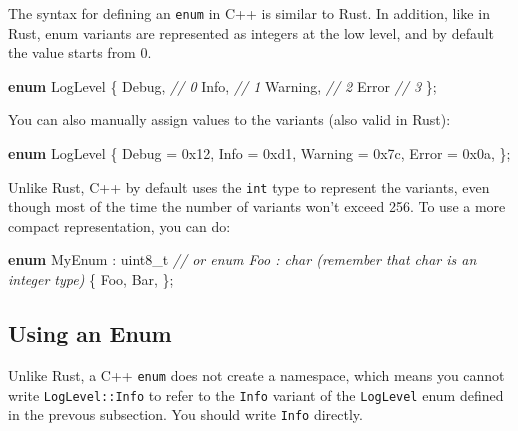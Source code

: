 \documentclass[
]{book}
\newenvironment{Shaded}{\begin{snugshade}}{\end{snugshade}}
\newcommand{\BaseNTok}[1]{\textcolor[rgb]{0.00,0.00,0.81}{#1}}
\newcommand{\CommentTok}[1]{\textcolor[rgb]{0.56,0.35,0.01}{\textit{#1}}}
\newcommand{\DataTypeTok}[1]{\textcolor[rgb]{0.13,0.29,0.53}{#1}}
\newcommand{\KeywordTok}[1]{\textcolor[rgb]{0.13,0.29,0.53}{\textbf{#1}}}
\newcommand{\NormalTok}[1]{#1}
\begin{document}
The syntax for defining an \texttt{enum} in C++ is similar to Rust. In addition, like in Rust, enum
variants are represented as integers at the low level, and by default the value starts from 0.

\begin{Shaded}
\begin{Highlighting}[]
\KeywordTok{enum}\NormalTok{ LogLevel}
\NormalTok{\{}
\NormalTok{    Debug,   }\CommentTok{// 0}
\NormalTok{    Info,    }\CommentTok{// 1}
\NormalTok{    Warning, }\CommentTok{// 2}
\NormalTok{    Error    }\CommentTok{// 3}
\NormalTok{\};}
\end{Highlighting}
\end{Shaded}

You can also manually assign values to the variants (also valid in Rust):

\begin{Shaded}
\begin{Highlighting}[]
\KeywordTok{enum}\NormalTok{ LogLevel}
\NormalTok{\{}
\NormalTok{    Debug   = }\BaseNTok{0x12}\NormalTok{,}
\NormalTok{    Info    = }\BaseNTok{0xd1}\NormalTok{,}
\NormalTok{    Warning = }\BaseNTok{0x7c}\NormalTok{,}
\NormalTok{    Error   = }\BaseNTok{0x0a}\NormalTok{,}
\NormalTok{\};}
\end{Highlighting}
\end{Shaded}

Unlike Rust, C++ by default uses the \texttt{int} type to represent the variants, even though most of the
time the number of variants won't exceed 256. To use a more compact representation, you can do:

\begin{Shaded}
\begin{Highlighting}[]
\KeywordTok{enum}\NormalTok{ MyEnum : }\DataTypeTok{uint8\_t}
\CommentTok{// or \textasciigrave{}enum Foo : char\textasciigrave{} (remember that \textasciigrave{}char\textasciigrave{} is an integer type)}
\NormalTok{\{}
\NormalTok{    Foo,}
\NormalTok{    Bar,}
\NormalTok{\};}
\end{Highlighting}
\end{Shaded}

\hypertarget{using-an-enum}{%
\subsection{Using an Enum}\label{using-an-enum}}

Unlike Rust, a C++ \texttt{enum} does not create a namespace, which means you cannot write \texttt{LogLevel::Info}
to refer to the \texttt{Info} variant of the \texttt{LogLevel} enum defined in the prevous subsection. You should
write \texttt{Info} directly.
\end{document}
